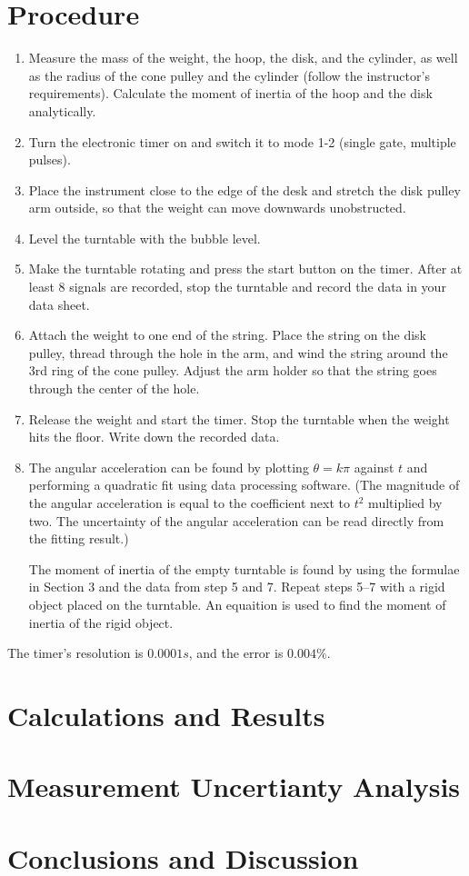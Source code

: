\documentclass[12pt,a4paper]{article}
\begin{document}
\section{Procedure}
\begin{enumerate}
\item Measure the mass of the weight, the hoop, the disk, and the cylinder, as
  well as the radius of the cone pulley and the cylinder (follow the
  instructor’s requirements). Calculate the moment of inertia of the hoop and
  the disk analytically.
\item Turn the electronic timer on and switch it to mode 1-2 (single gate,
  multiple pulses). 
\item Place the instrument close to the edge of the desk and stretch the disk
  pulley arm outside, so that the weight can move downwards unobstructed. 
\item Level the turntable with the bubble level.
\item Make the turntable rotating and press the start button on the timer. After
  at least 8 signals are recorded, stop the turntable and record the data in
  your data sheet. 
\item Attach the weight to one end of the string. Place the string on the disk
  pulley, thread through the hole in the arm, and wind the string around the 3rd
  ring of the cone pulley. Adjust the arm holder so that the string goes through
  the center of the hole. 
\item Release the weight and start the timer. Stop the turntable when the weight
  hits the floor. Write down the recorded data. 
\item The angular acceleration can be found by plotting $\theta =k\pi$ against
  $t$ and performing a quadratic fit using data processing software. (The
  magnitude of the angular acceleration is equal to the coefficient next to
  $t^2$ multiplied by two. The uncertainty of the angular acceleration can be
  read directly from the fitting result.) 

  The moment of inertia of the empty turntable is found by using the formulae in
  Section 3 and the data from step 5 and 7. Repeat steps 5--7 with a rigid
  object placed on the turntable. An equaition is used to find the moment of
  inertia of the rigid object. 
\end{enumerate}
The timer’s resolution is $0.0001 s$, and the error is $0.004\%$. 

\section{Calculations and Results}

\section{Measurement Uncertianty Analysis}

\section{Conclusions and Discussion}

\end{document}
